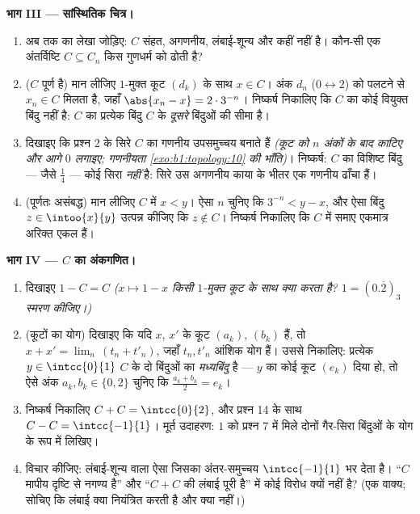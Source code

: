 \begin{problem}[{सप्ताहांत समस्या --- कैंटर का मध्य-तिहाई \omterm{def:b1:logic:sets}{समुच्चय}: लंबाई शून्य, अगणनीय, पूर्ण,
और $C + C =
\intcc{0}{2}$}]
\medskip \noindent\textbf{भाग III --- सांस्थितिक चित्र।}
\begin{enumerate}[resume]
  \item अब तक का लेखा जोड़िए: $C$ संहत, अगणनीय, लंबाई-शून्य और कहीं  नहीं
  है। कौन-सी एक अंतर्विष्टि $C \subseteq C_n$ किस गुणधर्म को ढोती है?
  \item ($C$ पूर्ण है) मान लीजिए $1$-मुक्त कूट $(d_k)$ के साथ $x \in C$। अंक
  $d_n$ ($0 \leftrightarrow 2$) को पलटने से $x_n \in C$ मिलता है, जहाँ
  $\abs{x_n - x} = 2 \cdot 3^{-n}$। निष्कर्ष निकालिए कि $C$ का कोई वियुक्त
  बिंदु नहीं है: $C$ का प्रत्येक बिंदु $C$ के \emph{दूसरे} बिंदुओं की सीमा
  है।
  \item दिखाइए कि प्रश्न 2 के सिरे $C$ का गणनीय  उपसमुच्चय बनाते हैं
  \emph{(कूट को $n$ अंकों के बाद काटिए और आगे $0$ लगाइए; गणनीयता
  \cref{exo:b1:topology:10} की भाँति)}। निष्कर्ष: $C$ का विशिष्ट बिंदु ---
  जैसे $\frac14$ --- कोई सिरा \emph{नहीं} है: सिरे उस अगणनीय काया के भीतर एक
  गणनीय ढाँचा हैं।
  \item (पूर्णतः असंबद्ध) मान लीजिए $C$ में $x < y$। ऐसा $n$ चुनिए कि
  $3^{-n} < y - x$, और ऐसा बिंदु $z \in \intoo{x}{y}$ उत्पन्न कीजिए कि $z
  \notin C$। निष्कर्ष निकालिए कि $C$ में समाए एकमात्र अरिक्त  एकल
   हैं।
\end{enumerate}

\medskip \noindent\textbf{भाग IV --- $C$ का अंकगणित।}
\begin{enumerate}[resume]
  \item दिखाइए $1 - C = C$ \emph{($x \mapsto 1 - x$ किसी $1$-मुक्त कूट के
  साथ क्या करता है? $1 = (0.\overline{2})_3$ स्मरण कीजिए।)}
  \item (कूटों का योग) दिखाइए कि यदि $x$, $x'$ के कूट $(a_k)$, $(b_k)$ हैं,
  तो $x + x' = \lim_n\,(t_n + t'_n)$, जहाँ $t_n, t'_n$ आंशिक योग हैं। उससे
  निकालिए: प्रत्येक $y \in \intcc{0}{1}$ $C$ के दो बिंदुओं का
  \emph{मध्यबिंदु} है --- $y$ का कोई कूट $(e_k)$ दिया हो, तो ऐसे अंक $a_k,
  b_k \in \{0, 2\}$ चुनिए कि $\frac{a_k + b_k}{2} = e_k$।
  \item निष्कर्ष निकालिए $C + C = \intcc{0}{2}$, और प्रश्न 14 के साथ $C - C
  = \intcc{-1}{1}$। मूर्त उदाहरण: $1$ को प्रश्न 7 में मिले दोनों गैर-सिरा
  बिंदुओं के योग के रूप में लिखिए।
  \item विचार कीजिए: लंबाई-शून्य वाला ऐसा  जिसका अंतर-समुच्चय
  $\intcc{-1}{1}$ भर देता है। ``$C$ मापीय दृष्टि से नगण्य है'' और ``$C + C$
  की लंबाई पूरी है'' में कोई विरोध क्यों नहीं है? (एक वाक्य; सोचिए कि लंबाई
  क्या नियंत्रित करती है और क्या नहीं।)
\end{enumerate}


\end{problem}
